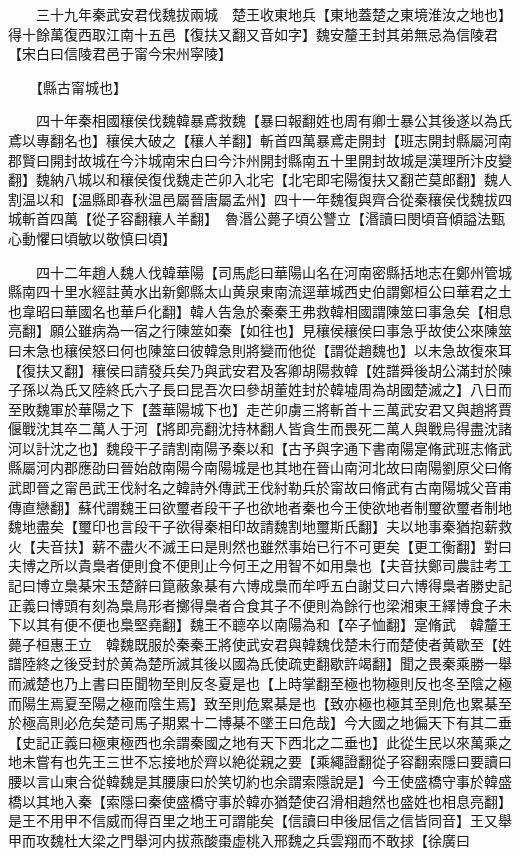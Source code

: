 　　三十九年秦武安君伐魏拔兩城　楚王收東地兵【東地蓋楚之東境淮汝之地也】得十餘萬復西取江南十五邑【復扶又翻又音如字】魏安釐王封其弟無忌為信陵君【宋白曰信陵君邑于甯今宋州寜陵】

　　【縣古甯城也】

　　四十年秦相國穰侯伐魏韓暴鳶救魏【暴曰報翻姓也周有卿士暴公其後遂以為氏鳶以專翻名也】穰侯大破之【穰人羊翻】斬首四萬暴鳶走開封【班志開封縣屬河南郡賢曰開封故城在今汴城南宋白曰今汴州開封縣南五十里開封故城是漢理所汴皮變翻】魏納八城以和穰侯復伐魏走芒卯入北宅【北宅即宅陽復扶又翻芒莫郎翻】魏人割温以和【温縣即春秋温邑屬晉唐屬孟州】四十一年魏復與齊合從秦穰侯伐魏拔四城斬首四萬【從子容翻穰人羊翻】　魯湣公薨子頃公讐立【湣讀曰閔頃音傾謚法甄心動懼曰頃敏以敬慎曰頃】

　　四十二年趙人魏人伐韓華陽【司馬彪曰華陽山名在河南密縣括地志在鄭州管城縣南四十里水經註黄水出新鄭縣太山黄泉東南流逕華城西史伯謂鄭桓公曰華君之土也韋昭曰華國名也華戶化翻】韓人告急於秦秦王弗救韓相國謂陳筮曰事急矣【相息亮翻】願公雖病為一宿之行陳筮如秦【如往也】見穰侯穰侯曰事急乎故使公來陳筮曰未急也穰侯怒曰何也陳筮曰彼韓急則將變而他從【謂從趙魏也】以未急故復來耳【復扶又翻】穰侯曰請發兵矣乃與武安君及客卿胡陽救韓【姓譜舜後胡公滿封於陳子孫以為氏又陸終氏六子長曰昆吾次曰參胡董姓封於韓墟周為胡國楚滅之】八日而至敗魏軍於華陽之下【蓋華陽城下也】走芒卯虜三將斬首十三萬武安君又與趙將賈偃戰沈其卒二萬人于河【將即亮翻沈持林翻人皆貪生而畏死二萬人與戰烏得盡沈諸河以計沈之也】魏段干子請割南陽予秦以和【古予與字通下書南陽寔脩武班志脩武縣屬河内郡應劭曰晉始啟南陽今南陽城是也其地在晉山南河北故曰南陽劉原父曰脩武即晉之甯邑武王伐紂名之韓詩外傳武王伐紂勒兵於甯故曰脩武有古南陽城父音甫傳直戀翻】蘇代謂魏王曰欲璽者段干子也欲地者秦也今王使欲地者制璽欲璽者制地魏地盡矣【璽印也言段干子欲得秦相印故請魏割地璽斯氏翻】夫以地事秦猶抱薪救火【夫音扶】薪不盡火不滅王曰是則然也雖然事始已行不可更矣【更工衡翻】對曰夫博之所以貴梟者便則食不便則止今何王之用智不如用梟也【夫音扶鄭司農註考工記曰博立梟棊宋玉楚辭曰箟蔽象棊有六博成梟而牟呼五白謝艾曰六博得梟者勝史記正義曰博頭有刻為梟鳥形者擲得梟者合食其子不便則為餘行也梁湘東王繹博食子未下以其有便不便也梟堅堯翻】魏王不聼卒以南陽為和【卒子恤翻】寔脩武　韓釐王薨子桓惠王立　韓魏既服於秦秦王將使武安君與韓魏伐楚未行而楚使者黄歇至【姓譜陸終之後受封於黄為楚所滅其後以國為氏使疏吏翻歇許竭翻】聞之畏秦乘勝一舉而滅楚也乃上書曰臣聞物至則反冬夏是也【上時掌翻至極也物極則反也冬至陰之極而陽生焉夏至陽之極而陰生焉】致至則危累棊是也【致亦極也極其至則危也累棊至於極高則必危矣楚司馬子期累十二博棊不墜王曰危哉】今大國之地徧天下有其二垂【史記正義曰極東極西也余謂秦國之地有天下西北之二垂也】此從生民以來萬乘之地未嘗有也先王三世不忘接地於齊以絶從親之要【乘繩證翻從子容翻索隱曰要讀曰腰以言山東合從韓魏是其腰康曰於笑切約也余謂索隱說是】今王使盛橋守事於韓盛橋以其地入秦【索隱曰秦使盛橋守事於韓亦猶楚使召滑相趙然也盛姓也相息亮翻】是王不用甲不信威而得百里之地王可謂能矣【信讀曰申後屈信之信皆同音】王又舉甲而攻魏杜大梁之門舉河内拔燕酸棗虚桃入邢魏之兵雲翔而不敢捄【徐廣曰